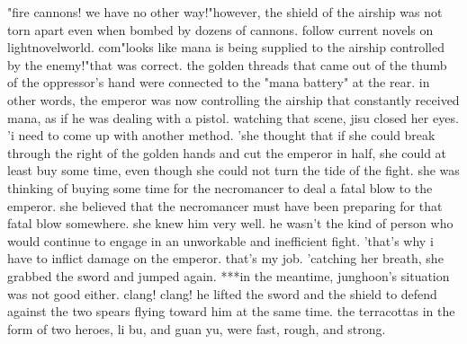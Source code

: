 "fire cannons! we have no other way!"however, the shield of the airship was not torn apart even when bombed by dozens of cannons.
 follow current novels on lightnovelworld.
com"looks like mana is being supplied to the airship controlled by the enemy!"that was correct.
 the golden threads that came out of the thumb of the oppressor's hand were connected to the "mana battery" at the rear.
in other words, the emperor was now controlling the airship that constantly received mana, as if he was dealing with a pistol.
watching that scene, jisu closed her eyes.
'i need to come up with another method.
'she thought that if she could break through the right of the golden hands and cut the emperor in half, she could at least buy some time, even though she could not turn the tide of the fight.
 she was thinking of buying some time for the necromancer to deal a fatal blow to the emperor.
she believed that the necromancer must have been preparing for that fatal blow somewhere.
 she knew him very well.
 he wasn't the kind of person who would continue to engage in an unworkable and inefficient fight.
 'that's why i have to inflict damage on the emperor.
 that's my job.
'catching her breath, she grabbed the sword and jumped again.
***in the meantime, junghoon's situation was not good either.
clang! clang! he lifted the sword and the shield to defend against the two spears flying toward him at the same time.
 the terracottas in the form of two heroes, li bu, and guan yu, were fast, rough, and strong.

